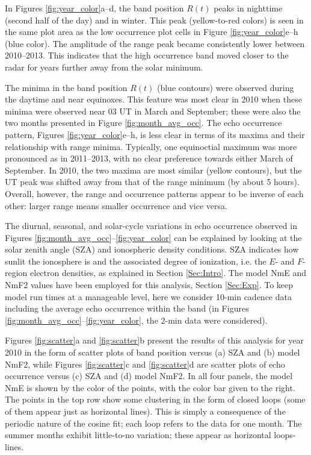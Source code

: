 In Figures \ref{fig:year_color}a--d, the band position \(R\left(t\right)\) peaks in nighttime (second half of the day) and in winter. This peak (yellow-to-red colors) is seen in the same plot area as the low occurrence plot cells in Figure \ref{fig:year_color}e--h (blue color). The amplitude of the range peak became consistently lower between 2010--2013.  This indicates that the high occurrence band moved closer to the radar for years further away from the solar minimum.

The minima in the band position \(R\left(t\right)\) (blue contours) were observed during the daytime and near equinoxes. This feature was most clear in 2010 when these minima were observed near 03 UT in March and September; these were also the two months presented in Figure \ref{fig:month_avg_occ}. The echo occurrence pattern, Figures \ref{fig:year_color}e--h, is less clear in terms of its maxima and their relationship with range minima. Typically, one equinoctial maximum was more pronounced as in 2011--2013, with no clear preference towards either March of September. In 2010, the two maxima are most similar (yellow contours), but the UT peak was shifted away from that of the range minimum (by about 5 hours). Overall, however, the range and occurrence patterns appear to be inverse of each other: larger range means smaller occurrence and vice versa.

The diurnal, seasonal, and solar-cycle variations in echo occurrence observed in Figures \ref{fig:month_avg_occ}--\ref{fig:year_color} can be explained by looking at the solar zenith angle (SZA) and ionospheric density conditions. SZA indicates how sunlit the ionosphere is and the associated degree of ionization, i.e. the \(E\)- and \(F\)-region electron densities, as explained in Section \ref{Sec:Intro}. The model NmE and NmF2 values have been employed for this analysis, Section \ref{Sec:Exp}. To keep model run times at a manageable level, here we consider 10-min cadence data including the average echo occurrence within the band (in Figures \ref{fig:month_avg_occ}--\ref{fig:year_color}, the 2-min data were considered).



Figures \ref{fig:scatter}a and \ref{fig:scatter}b present the results of this analysis for year 2010 in the form of scatter plots of band position versus (a) SZA and (b) model NmF2, while Figures \ref{fig:scatter}c and \ref{fig:scatter}d are scatter plots of echo occurrence versus (c) SZA and (d) model NmF2. In all four panels, the model NmE is shown by the color of the points, with the color bar given to the right. The points in the top row show some clustering in the form of closed loops (some of them appear just as horizontal lines). This is simply a consequence of the periodic nature of the cosine fit; each loop refers to the data for one month. The summer months exhibit little-to-no variation; these appear as horizontal loops-lines.

